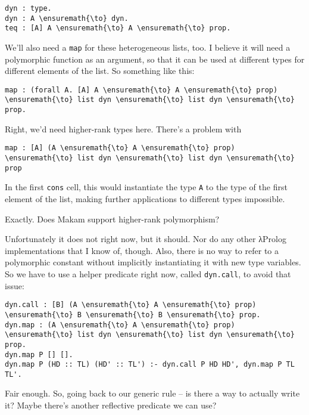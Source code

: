 \begin{verbatim}
dyn : type.
dyn : A \ensuremath{\to} dyn.
teq : [A] A \ensuremath{\to} A \ensuremath{\to} prop.
\end{verbatim}

\heroSTUDENT{} We'll also need a \texttt{map} for these heterogeneous lists,
too. I believe it will need a polymorphic function as an argument, so
that it can be used at different types for different elements of the
list. So something like this:

\begin{verbatim}
map : (forall A. [A] A \ensuremath{\to} A \ensuremath{\to} prop) \ensuremath{\to} list dyn \ensuremath{\to} list dyn \ensuremath{\to} prop.
\end{verbatim}

\heroADVISOR{} Right, we'd need higher-rank types here. There's a problem with

\begin{verbatim}
map : [A] (A \ensuremath{\to} A \ensuremath{\to} prop) \ensuremath{\to} list dyn \ensuremath{\to} list dyn \ensuremath{\to} prop
\end{verbatim}

In the first \texttt{cons} cell, this would instantiate the type
\texttt{A} to the type of the first element of the list, making further
applications to different types impossible.

\heroSTUDENT{} Exactly. Does Makam support higher-rank polymorphism?

\heroADVISOR{} Unfortunately it does not right now, but it should. Nor do any
other \foreignlanguage{greek}{λ}Prolog implementations that I know of, though. Also, there is no
way to refer to a polymorphic constant without implicitly instantiating
it with new type variables. So we have to use a helper predicate right
now, called \texttt{dyn.call}, to avoid that issue:

\begin{verbatim}
dyn.call : [B] (A \ensuremath{\to} A \ensuremath{\to} prop) \ensuremath{\to} B \ensuremath{\to} B \ensuremath{\to} prop.
dyn.map : (A \ensuremath{\to} A \ensuremath{\to} prop) \ensuremath{\to} list dyn \ensuremath{\to} list dyn \ensuremath{\to} prop.
dyn.map P [] [].
dyn.map P (HD :: TL) (HD' :: TL') :- dyn.call P HD HD', dyn.map P TL TL'.
\end{verbatim}

\heroSTUDENT{} Fair enough. So, going back to our generic rule -- is there a
way to actually write it? Maybe there's another reflective predicate we
can use?

